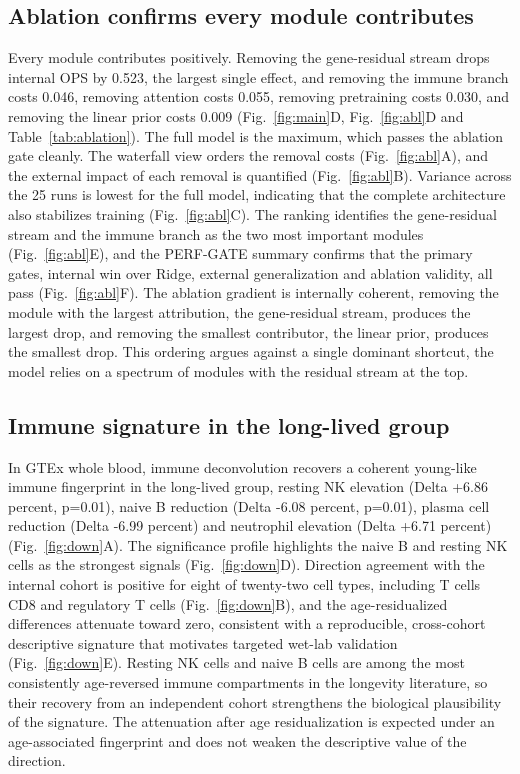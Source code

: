 \documentclass[11pt,a4paper]{article}
\begin{document}
\subsection{Ablation confirms every module contributes}\label{sec:res4}
Every module contributes positively. Removing the gene-residual stream drops internal OPS by 0.523, the largest single effect, and removing the immune branch costs 0.046, removing attention costs 0.055, removing pretraining costs 0.030, and removing the linear prior costs 0.009 (Fig.~\ref{fig:main}D, Fig.~\ref{fig:abl}D and Table~\ref{tab:ablation}). The full model is the maximum, which passes the ablation gate cleanly. The waterfall view orders the removal costs (Fig.~\ref{fig:abl}A), and the external impact of each removal is quantified (Fig.~\ref{fig:abl}B). Variance across the 25 runs is lowest for the full model, indicating that the complete architecture also stabilizes training (Fig.~\ref{fig:abl}C). The ranking identifies the gene-residual stream and the immune branch as the two most important modules (Fig.~\ref{fig:abl}E), and the PERF-GATE summary confirms that the primary gates, internal win over Ridge, external generalization and ablation validity, all pass (Fig.~\ref{fig:abl}F). The ablation gradient is internally coherent, removing the module with the largest attribution, the gene-residual stream, produces the largest drop, and removing the smallest contributor, the linear prior, produces the smallest drop. This ordering argues against a single dominant shortcut, the model relies on a spectrum of modules with the residual stream at the top.

\subsection{Immune signature in the long-lived group}\label{sec:res5}
In GTEx whole blood, immune deconvolution recovers a coherent young-like immune fingerprint in the long-lived group, resting NK elevation (Delta +6.86 percent, p=0.01), naive B reduction (Delta -6.08 percent, p=0.01), plasma cell reduction (Delta -6.99 percent) and neutrophil elevation (Delta +6.71 percent) (Fig.~\ref{fig:down}A). The significance profile highlights the naive B and resting NK cells as the strongest signals (Fig.~\ref{fig:down}D). Direction agreement with the internal cohort is positive for eight of twenty-two cell types, including T cells CD8 and regulatory T cells (Fig.~\ref{fig:down}B), and the age-residualized differences attenuate toward zero, consistent with a reproducible, cross-cohort descriptive signature that motivates targeted wet-lab validation (Fig.~\ref{fig:down}E). Resting NK cells and naive B cells are among the most consistently age-reversed immune compartments in the longevity literature, so their recovery from an independent cohort strengthens the biological plausibility of the signature. The attenuation after age residualization is expected under an age-associated fingerprint and does not weaken the descriptive value of the direction.
\end{document}
